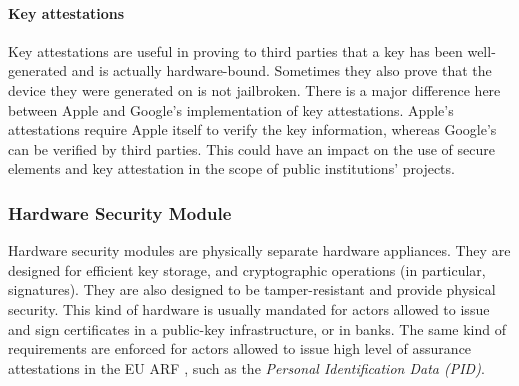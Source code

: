 \paragraph{Key attestations} Key attestations are useful in proving to third parties that a key has been well-generated and is actually hardware-bound. Sometimes they also prove that the device they were generated on is not jailbroken. There is a major difference here between Apple and Google's implementation of key attestations. Apple's attestations require Apple itself to verify the key information, whereas Google's can be verified by third parties. This could have an impact on the use of secure elements and key attestation in the scope of public institutions' \eid projects.

\subsubsection{Hardware Security Module} Hardware security modules are physically separate hardware appliances. They are designed for efficient key storage, and cryptographic operations (in particular, signatures). They are also designed to be tamper-resistant and provide physical security. This kind of hardware is usually mandated for actors allowed to issue and sign certificates in a public-key infrastructure, or in banks. The same kind of requirements are enforced for actors allowed to issue high level of assurance attestations in the EU ARF \cite{EUDI-ARF}, such as the \emph{Personal Identification Data (PID)}.

